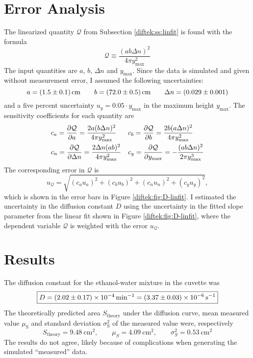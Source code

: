 \documentclass[11pt, a4paper]{article}
\begin{document}
\section{Error Analysis}
The linearized quantity $ \mathcal{Q} $ from Subsection \ref{diftek:ss:linfit} is found with the formula
\begin{equation*}
	\mathcal{Q} \equiv \frac{(ab\Delta n)^{2}}{4\pi y_{\text{max}}^{2}}
\end{equation*}
The input quantities are $ a $, $ b $, $ \Delta n $ and $ y_{\text{max}} $. Since the data is simulated and given without measurement error, I assumed the following uncertainties:
\begin{equation*}
	a = \SI{1.5 \pm 0.1}{\centi \meter} \qquad b = \SI{72.0 \pm 0.5}{\centi \meter}  \qquad \Delta n = \SI{0.029 \pm 0.001}{}
\end{equation*}
and a five percent uncertainty $ u_{y} = 0.05 \cdot y_{\text{max}} $ in the maximum height $ y_{\text{max}} $. The sensitivity coefficients for each quantity are
\begin{align*}
	&c_{a} = \pdv{\mathcal{Q}}{a} = \frac{2a(b\Delta n)^{2}}{4\pi y_{\text{max}}^{2}} && c_{b} = \pdv{\mathcal{Q}}{b} = \frac{2b(a\Delta n)^{2}}{4\pi y_{\text{max}}^{2}}\\
	&c_{n} =\pdv{\mathcal{Q}}{\Delta n} = \frac{2\Delta n(ab)^{2}}{4\pi y_{\text{max}}^{2}} && c_{y} = \pdv{\mathcal{Q}}{y_{\text{max}}} = -\frac{(ab\Delta n)^{2}}{2\pi y_{\text{max}}^{3}}
\end{align*}
The corresponding error in $ \mathcal{Q} $ is
\begin{equation*}
	u_{\mathcal{Q}} = \sqrt{(c_{a}u_{a})^{2} + (c_{b}u_{b})^{2} + (c_{n}u_{n})^{2} + (c_{y}u_{y})^{2}},
\end{equation*}
which is shown in the error bars in Figure \ref{diftek:fig:D-linfit}. I estimated the uncertainty in the diffusion constant $ D $ using the uncertainty in the fitted slope parameter from the linear fit shown in Figure \ref{diftek:fig:D-linfit}, where the dependent variable $ \mathcal{Q} $ is weighted with the error $ u_{\mathcal{Q}} $.

\section{Results}
The diffusion constant for the ethanol-water mixture in the cuvette was 
\begin{equation*}
\boxed{	D = \SI{2.02 \pm 0.17 e-4}{\minute^{-1}} = \SI{3.37 \pm 0.03 e-6}{\second^{-1}}}
\end{equation*}
The theoretically predicted area $ S_{\text{theory}} $ under the diffusion curve, mean measured value $ \mu_{\text{S}} $ and standard deviation $ \sigma^{2}_{\text{S}} $ of the measured value were, respectively
\begin{equation*}
	S_{\text{theory}} = \SI{9.48}{\centi \meter^{2}}, \qquad \mu_{S} = \SI{4.09}{\centi \meter^{2}}, \qquad \sigma_{S}^{2} = \SI{0.53}{\centi \meter^{2}}
\end{equation*}
The results do not agree, likely because of complications when generating the simulated ``measured'' data.
\end{document}

